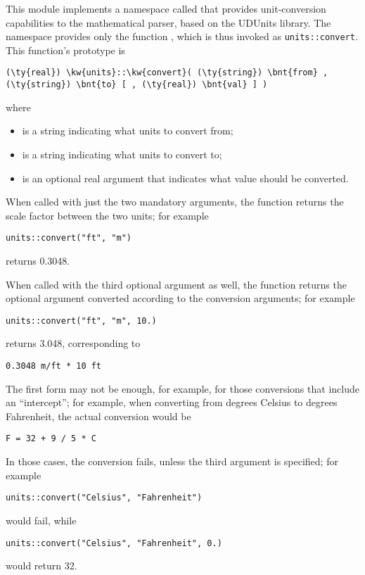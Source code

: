 \noindent
This module implements a namespace called 
that provides unit-conversion capabilities
to the mathematical parser, based on the UDUnits library.
The namespace provides only the function ,
which is thus invoked as \texttt{units::convert}.
This function's prototype is
\begin{Verbatim}[commandchars=\\\{\}]
    (\ty{real}) \kw{units}::\kw{convert}( (\ty{string}) \bnt{from} , (\ty{string}) \bnt{to} [ , (\ty{real}) \bnt{val} ] )
\end{Verbatim}
where
\begin{itemize}
\item {} is a string indicating what units to convert from;
\item {} is a string indicating what units to convert to;
\item {} is an optional real argument that indicates what value should be converted.
\end{itemize}
When called with just the two mandatory arguments, the function returns the
scale factor between the two units; for example
\begin{Verbatim}[commandchars=\\\{\}]
    units::convert("ft", "m")
\end{Verbatim}
returns 0.3048.

When called with the third optional argument  as well, the function returns
the optional argument  converted according to the conversion arguments;
for example
\begin{Verbatim}[commandchars=\\\{\}]
    units::convert("ft", "m", 10.)
\end{Verbatim}
returns 3.048, corresponding to
\begin{Verbatim}[commandchars=\\\{\}]
    0.3048 m/ft * 10 ft
\end{Verbatim}

The first form may not be enough, for example, for those conversions
that include an ``intercept''; for example, when converting from degrees 
Celsius to degrees Fahrenheit, the actual conversion would be
\begin{Verbatim}[commandchars=\\\{\}]
    F = 32 + 9 / 5 * C
\end{Verbatim}
In those cases, the conversion fails, unless the third argument 
is specified; for example
\begin{Verbatim}[commandchars=\\\{\}]
    units::convert("Celsius", "Fahrenheit")
\end{Verbatim}
would fail, while
\begin{Verbatim}[commandchars=\\\{\}]
    units::convert("Celsius", "Fahrenheit", 0.)
\end{Verbatim}
would return 32.

